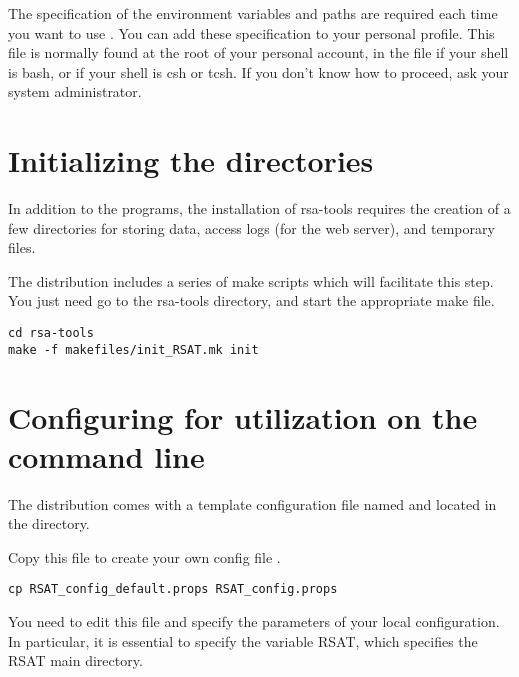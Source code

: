 \documentclass{book}
\begin{document}
The specification of the environment variables and paths are required
each time you want to use \RSAT. You can add these specification to
your personal profile.  This file is normally found at the root of
your personal account, in the file  if your shell is
bash, or  if your shell is csh or tcsh. If you don't know
how to proceed, ask your system administrator.



\section{Initializing the directories}

In addition to the programs, the installation of rsa-tools requires
the creation of a few directories for storing data, access logs (for
the web server), and temporary files.

The distribution includes a series of make scripts which will
facilitate this step. You just need go to the rsa-tools directory, and
start the appropriate make file.

\begin{verbatim}
cd rsa-tools
make -f makefiles/init_RSAT.mk init
\end{verbatim}


\section{Configuring \RSAT for utilization on the command line}

The \RSAT distribution comes with a template configuration file named
 and located in the 
directory.

Copy this file to create your own config file .

\begin{verbatim}
cp RSAT_config_default.props RSAT_config.props
\end{verbatim}

You need to edit this file and specify the parameters of your local
configuration. In particular, it is essential to specify the variable
RSAT, which specifies the RSAT main directory.

\end{document}
